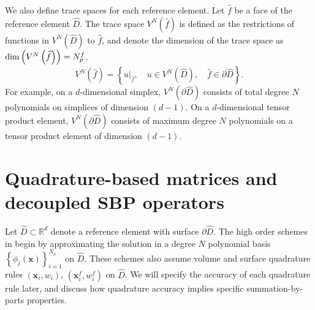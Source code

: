 \documentclass{svjour3}                     %
\renewcommand{\hat}{\widehat}
\newcommand{\LRp}[1]{\left( #1 \right)}
\newcommand{\LRc}[1]{\left\{ #1 \right\}}
\renewcommand{\note}[1]{{\color{blue}{#1}}}
\begin{document}
We also define trace spaces for each reference element.  Let $\hat{f}$ be a face of the reference element $\hat{D}$.  The trace space $V^N \LRp{\hat{f}}$ is defined as the restrictions of functions in $V^N\LRp{\hat{D}}$ to $\hat{f}$, and denote the dimension of the trace space as ${\rm dim}\LRp{V^N\LRp{{\hat{f}}}} = N^f_p$.  
\[
V^N \LRp{\hat{f}} = \LRc{ \left.u\right|_{\hat{f}}, \quad u \in V^N\LRp{\hat{D}}, \quad \hat{f}\in \partial\hat{D}}.
\]
For example, on a $d$-dimensional simplex, $V^N \LRp{\partial \hat{D}}$ consists of total degree $N$ polynomials on simplices of dimension $(d-1)$.  On a $d$-dimensional tensor product element, $V^N \LRp{\partial \hat{D}}$ consists of maximum degree $N$ polynomials on a tensor product element of dimension $(d-1)$.  




\section{Quadrature-based matrices and decoupled SBP operators}
\label{sec:sbp}
Let $\hat{D} \subset\mathbb{R}^d$ denote a reference element with surface $\partial \hat{D}$.  
The high order schemes in \cite{chan2017discretely, chan2018discretely} begin by approximating the solution in a degree $N$ polynomial basis $\LRc{\phi_j({\bm{x}})}_{i=1}^{N_p}$ on $\hat{D}$.  These schemes also assume volume and surface quadrature rules $({\bm{x}}_i, w_i)$, $\LRp{{\bm{x}}^f_i,w^f_i}$ on $\hat{D}$.  We will specify the accuracy of each quadrature rule later, and discuss how quadrature accuracy implies specific summation-by-parts properties.  
\end{document}
